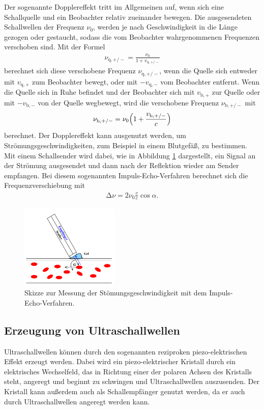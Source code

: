 Der sogenannte Dopplereffekt tritt im Allgemeinen auf, wenn sich eine
Schallquelle und ein Beobachter relativ zueinander bewegen. Die
ausgesendeten Schallwellen der Frequenz $\nu_0$, werden je nach Geschwindigkeit
in die Länge gezogen oder gestaucht, sodass die vom Beobachter wahrgenommenen
Frequenzen
verschoben sind.
Mit der Formel
\begin{align}
  \nu_{\text{q},+/-} = \frac{\nu_0}{1 + v_{\text{q},+/-}}
\end{align}
berechnet sich diese verschobene Frequenz $\nu_{\text{q},+/-}$, wenn die Quelle sich entweder
mit $v_{\text{q},+}$ zum Beobachter bewegt, oder mit $-v_{\text{q},-}$ vom Beobachter entfernt.
Wenn die Quelle sich in Ruhe befindet und der Beobachter sich mit $v_{\text{b},+}$ zur Quelle
oder mit $-v_{\text{b},-}$ von der Quelle wegbewegt, wird die verschobene
Frequenz $\nu_{\text{b},+/-}$ mit
\begin{align}
  \nu_{\text{b},+/-} = \nu_0 \Bigl(1 + \frac{v_{\text{b},+/-}}{c} \Bigr)
\end{align}
berechnet.
Der Dopplereffekt kann ausgenutzt werden, um Strömungsgeschwindigkeiten, zum
Beispiel in einem Blutgefäß, zu bestimmen. Mit einem Schallsender wird
dabei, wie in Abbildung \ref{fig:ImpulsEcho} dargestellt, ein Signal an
der Strömung ausgesendet und dann nach der Reflektion wieder am Sender
empfangen. Bei diesem sogenannten Impuls-Echo-Verfahren berechnet sich
die Frequenzverschiebung mit
\begin{align}
  \increment \nu = 2 \nu_0 \frac{v}{c} \cos{\alpha}.
  \label{eqn:deltanu}
\end{align}

\begin{figure}
  \centering
  \includegraphics[height=4cm]{ImpulsEcho.png}
  \caption{Skizze zur Messung der Stömungsgeschwindigkeit mit dem
  Impuls-Echo-Verfahren. \cite{anleitung}}
  \label{fig:ImpulsEcho}
\end{figure}

\subsection{Erzeugung von Ultraschallwellen}

Ultraschallwellen können durch den sogenannten reziproken piezo-elektrischen
Effekt erzeugt werden. Dabei wird ein piezo-elektrischer Kristall durch ein
elektrisches Wechselfeld,
das in Richtung einer der polaren Achsen des Kristalls steht, angeregt und
beginnt zu schwingen und Ultraschallwellen auszusenden.
Der Kristall kann außerdem auch als Schallempfänger genutzt werden, da er auch
durch Ultraschallwellen angeregt werden kann.

